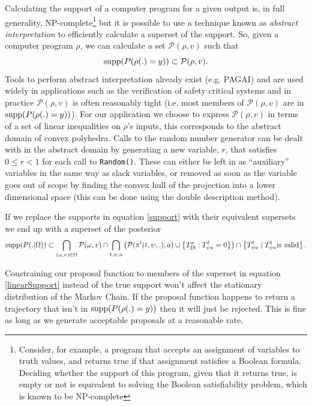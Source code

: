 Calculating the support of a computer program for a given output is, in full generality, NP-complete\footnote{Consider, for example, a program that accepts an assignment of variables to truth values, and returns true if that assignment satisfies a Boolean formula. Deciding whether the support of this program, given that it returns true, is empty or not is equivalent to solving the Boolean satisfiability problem, which is known to be NP-complete\cite{cook1971complexity}} but it is possible to use a technique known as \textit{abstract interpretation}\cite{cousot1977abstract} to efficiently calculate a superset of the support. So, given a computer program $\rho$, we can calculate a set $\mathcal{P}(\rho, v)$ such that
\[
\operatorname{supp}(P(\rho(.)=y)) \subset \mathcal{P}(\rho, v).
\]
Tools to perform abstract interpretation already exist (e.g. PAGAI\cite{henry2012pagai}) and are used widely in applications such as the verification of safety critical systems\cite{blanchet2003static} and in practice $\mathcal{P}(\rho, v)$ is often reasonably tight (i.e. most members of $\mathcal{P}(\rho, v)$ are in $\operatorname{supp}(P(\rho(.)=y))$). For our application we choose to express $\mathcal{P}(\rho, v)$ in terms of a set of linear inequalities on $\rho$'s inputs, this corresponds to the abstract domain of convex polyhedra\cite{cousot1978automatic}\cite{becchi2018efficient}. Calls to the random number generator can be dealt with in the abstract domain by generating a new variable, $r$, that satisfies $0 \le r < 1$ for each call to \texttt{Random()}. These can either be left in as ``auxiliary'' variables in the same way as slack variables, or removed as soon as the variable goes out of scope by finding the convex hull of the projection into a lower dimensional space (this can be done using the double description method\cite{motzkin1953double}).

If we replace the supports in equation \ref{support} with their equivalent supersets we end up with a superset of the posterior
\begin{equation}
\operatorname{supp}(P(.|\Omega)) \subset
\bigcap_{(\omega,v) \in \Omega}  \mathcal{P}(\omega, v) \cap
\bigcap_{t, \psi, a} \left( \mathcal{P}(\pi'(t,\psi,.), a) \cup \left\{T^s_{\xi b}: T^t_{\psi a} = 0\right\} \right)\cap
\left\{T^t_{\psi a} \mid T^t_{\psi a} \text{is valid}\right\}.
\label{linearSupport}
\end{equation}

Constraining our proposal function to members of the superset in equation \ref{linearSupport} instead of the true support won't affect the stationary distribution of the Markov Chain. If the proposal function happens to return a trajectory that isn't in $\operatorname{supp}(P(\rho(.)=y))$ then it will just be rejected. This is fine as long as we generate acceptable proposals at a reasonable rate.

